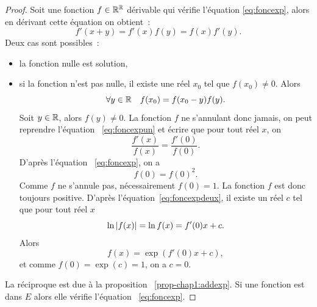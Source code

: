 \begin{proof}
    Soit une fonction \(f \in \mathbb{R}^{\mathbb{R}}\) dérivable qui vérifie l'équation 
    \eqref{eq:foncexp}, alors en dérivant cette équation on obtient~:
    \begin{equation}
        \label{eq:foncexpun}
        f'(x+y)=f'(x)f(y)=f(x)f'(y).
    \end{equation}
    Deux cas sont possibles~:
    \begin{itemize}
        \item la fonction nulle est solution,
        \item si la fonction n'est pas nulle, il existe une réel \(x_0\) tel 
            que \(f(x_0) \neq 0\). Alors
            \begin{equation}
                \forall y \in \mathbb{R} \quad f(x_0)= f(x_0-y)f(y).
            \end{equation}
            Soit \(y \in \mathbb{R}\), alors \(f(y) \neq 0\). La fonction \(f\) ne 
            s'annulant donc jamais, on peut reprendre 
            l'équation~
\ref{eq:foncexpun} et écrire que pour tout réel 
            \(x\), on \begin{equation}
                \label{eq:foncexpdeux}
                \frac{f'(x)}{f(x)}=\frac{f'(0)}{f(0)}.
            \end{equation}
            D'après l'équation~
\ref{eq:foncexp}, on a
            \begin{equation}
                f(0)=f(0)^2.
            \end{equation}
            Comme \(f\) ne s'annule pas, nécessairement \(f(0)=1\). La 
            fonction \(f\) est donc toujours positive. D'après 
            l'équation~\eqref{eq:foncexpdeux}, il existe un réel \(c\) tel 
            que pour tout réel \(x\)
            \begin{equation}
                \ln \left\lvert f(x)\right\rvert=\ln f(x)=f'(0) x + c.
            \end{equation}
            Alors
            \begin{equation}
                f(x)=\exp(f'(0) x +c),
            \end{equation}
            et comme \(f(0)=\exp(c)=1\), on a \(c=0\).
    \end{itemize}
    La réciproque est due à la proposition~
\ref{prop-chap1:addexp}. Si une 
    fonction est dans \(E\) alors elle vérifie l'équation~
\ref{eq:foncexp}.
\end{proof}
